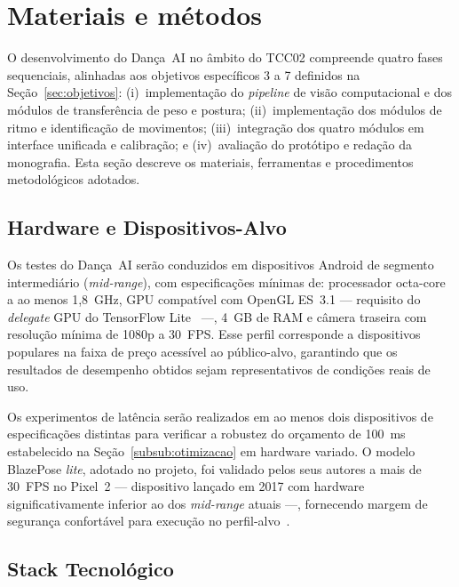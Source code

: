 \newpage
\section{Materiais e métodos}
\label{sc:materiais_e_metodos}

O desenvolvimento do Dança~AI no âmbito do TCC02 compreende quatro fases sequenciais,
alinhadas aos objetivos específicos 3 a 7 definidos na Seção~\ref{sec:objetivos}:
(i)~implementação do \textit{pipeline} de visão computacional e dos módulos de transferência
de peso e postura; (ii)~implementação dos módulos de ritmo e identificação de movimentos;
(iii)~integração dos quatro módulos em interface unificada e calibração; e
(iv)~avaliação do protótipo e redação da monografia. Esta seção descreve os materiais,
ferramentas e procedimentos metodológicos adotados.

\subsection{Hardware e Dispositivos-Alvo}
\label{sub:hardware}

Os testes do Dança~AI serão conduzidos em dispositivos Android de segmento intermediário
(\textit{mid-range}), com especificações mínimas de: processador octa-core a ao menos
1{,}8~GHz, GPU compatível com OpenGL ES~3.1 --- requisito do \textit{delegate} GPU do
TensorFlow Lite~\cite{lee2019ondevice} ---, 4~GB de RAM e câmera traseira com resolução
mínima de 1080p a 30~FPS. Esse perfil corresponde a dispositivos populares na faixa de preço
acessível ao público-alvo, garantindo que os resultados de desempenho obtidos sejam
representativos de condições reais de uso.

Os experimentos de latência serão realizados em ao menos dois dispositivos de especificações
distintas para verificar a robustez do orçamento de 100~ms estabelecido na
Seção~\ref{subsub:otimizacao} em hardware variado. O modelo BlazePose \textit{lite},
adotado no projeto, foi validado pelos seus autores a mais de 30~FPS no Pixel~2 --- dispositivo
lançado em 2017 com hardware significativamente inferior ao dos \textit{mid-range} atuais ---,
fornecendo margem de segurança confortável para execução no perfil-alvo~\cite{bazarevsky2020blazeposeondevicerealtimebody}.

\subsection{Stack Tecnológico}
\label{sub:stack}

